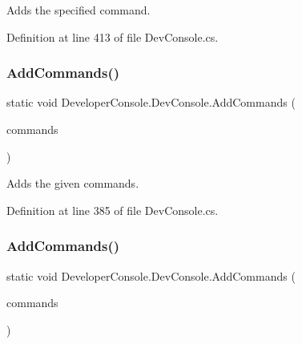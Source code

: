 Adds the specified command. 



Definition at line 413 of file Dev\+Console.\+cs.

\mbox{\label{class_developer_console_1_1_dev_console_a8772e0ab4d0a0e0813edfd34cded2012}} 
\subsubsection{\texorpdfstring{Add\+Commands()}{AddCommands()}\hspace{0.1cm}{\footnotesize\ttfamily [1/2]}}
{\footnotesize\ttfamily static void Developer\+Console.\+Dev\+Console.\+Add\+Commands (\begin{DoxyParamCaption}\item[{I\+Enumerable$<$ \hyperlink{class_developer_console_1_1_core_1_1_command_base}{Command\+Base} $>$}]{commands }\end{DoxyParamCaption})\hspace{0.3cm}{\ttfamily [static]}}



Adds the given commands. 



Definition at line 385 of file Dev\+Console.\+cs.

\mbox{\label{class_developer_console_1_1_dev_console_a071a365e37266ddd90f6851490fc4c49}} 
\subsubsection{\texorpdfstring{Add\+Commands()}{AddCommands()}\hspace{0.1cm}{\footnotesize\ttfamily [2/2]}}
{\footnotesize\ttfamily static void Developer\+Console.\+Dev\+Console.\+Add\+Commands (\begin{DoxyParamCaption}\item[{params \hyperlink{class_developer_console_1_1_core_1_1_command_base}{Command\+Base} \mbox{[}$\,$\mbox{]}}]{commands }\end{DoxyParamCaption})\hspace{0.3cm}{\ttfamily [static]}}



